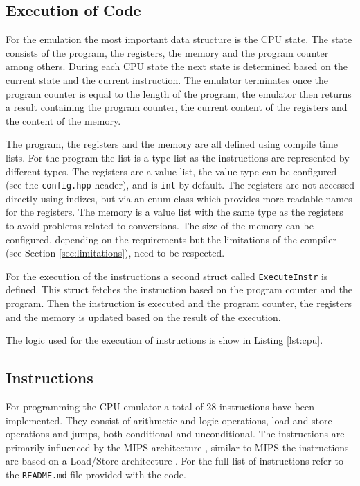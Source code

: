 
\subsection{Execution of Code}
For the emulation the most important data structure is the CPU state. The state consists of the program, the registers,
the memory and the program counter among others. During each CPU state the next state is determined based on the 
current state and the current instruction.
The emulator terminates once the program counter is equal to the length of the program,
the emulator then returns a result containing the program counter, the current content
of the registers and the content of the memory.

The program, the registers and the memory are all defined using  compile time lists.
For the program the list is a type list as the instructions are represented by different
types. The registers are a value list, the value type can be configured (see the
\texttt{config.hpp} header), and is \lstinline{int} by default. The registers are not
accessed directly using indizes, but via an enum class which provides
more readable names for the registers. The memory is a value list with the same type
as the registers to avoid problems related to conversions. The size of the memory
can be configured, depending on the requirements but the limitations of the compiler 
(see Section \ref{sec:limitations}), need to be respected.

For the execution of the instructions a second struct called \lstinline{ExecuteInstr} is defined. 
This struct fetches the instruction based on the program counter and the program. Then
the instruction is executed and the program counter, the registers and the memory is
updated based on the result of the execution.

The logic used for the execution of instructions is show in Listing \ref{lst:cpu}.



\subsection{Instructions}

For programming the CPU emulator a total of 28 instructions have been implemented. They consist of arithmetic and logic
operations, load and store operations and jumps, both conditional and unconditional. The instructions are primarily 
influenced by the MIPS architecture , similar to MIPS the instructions are based
on a Load/Store architecture . For the full list of instructions refer to the \texttt{README.md} file provided with the code. 

